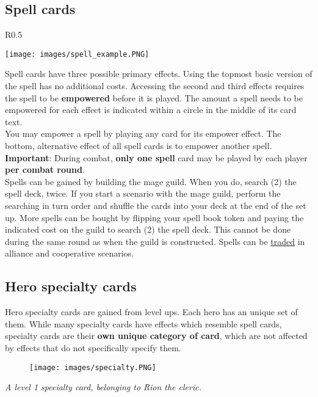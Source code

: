 \documentclass[12pt]{article}
\begin{document}
\clearpage

\subsection*{\hypertarget{spells}{Spell cards}}
\begin{wrapfigure}{R}{0.5\textwidth}
    \begin{center}
    \texttt{[image: images/spell\_example.PNG]}
    \end{center}
\end{wrapfigure}
Spell cards have three possible primary effects. Using the topmost basic version of the spell has no additional costs. Accessing the second and third effects requires the spell to be \textbf{empowered} before it is played. The amount a spell needs to be empowered for each effect is indicated within a circle in the middle of its card text.\\[6pt]
You may empower a spell by playing any card for its empower  effect. The bottom, alternative effect of all spell cards is to empower another spell.\\[6pt]
\textbf{Important}: During combat, \textbf{only one spell} card may be played by each player \textbf{per combat round}.\\[6pt]
Spells can be gained by building the mage guild. When you do, search (2) the spell deck, twice. If you start a scenario with the mage guild, perform the searching in turn order and shuffle the cards into your deck at the end of the set up. More spells can be bought by flipping your spell book token and paying the indicated cost on the guild to search (2) the spell deck. This cannot be done during the same round as when the guild is constructed. Spells can be \hyperlink{Trading}{traded} in alliance and cooperative scenarios.

\subsection*{\hypertarget{Specialty}{Hero specialty cards}}
Hero specialty cards are gained from level ups. Each hero has an unique set of them. While many specialty cards have effects which resemble spell cards, specialty cards are their \textbf{own unique category of card}, which are not affected by effects that do not specifically specify them.
\\[6pt]

\begin{figure}[h]
\centering
\texttt{[image: images/specialty.PNG]}
\end{figure}
\begin{center}
\textit{A level 1 specialty card, belonging to Rion the cleric.}
\end{center}
\end{document}
